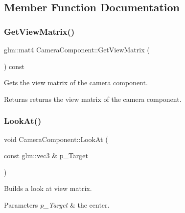 \subsection{Member Function Documentation}
\mbox{\label{class_camera_component_a7304926c3974f8a80e3fc0a6c5e49cd1}} 
\subsubsection{\texorpdfstring{GetViewMatrix()}{GetViewMatrix()}}
{\footnotesize\ttfamily glm\+::mat4 Camera\+Component\+::\+Get\+View\+Matrix (\begin{DoxyParamCaption}{ }\end{DoxyParamCaption}) const\hspace{0.3cm}{\ttfamily [inline]}}



Gets the view matrix of the camera component. 

\begin{DoxyReturn}{Returns}
returns the view matrix of the camera component. 
\end{DoxyReturn}
\mbox{\label{class_camera_component_a4c4afaba244a809c07db05e9ec958a5d}} 
\subsubsection{\texorpdfstring{LookAt()}{LookAt()}}
{\footnotesize\ttfamily void Camera\+Component\+::\+Look\+At (\begin{DoxyParamCaption}\item[{const glm\+::vec3 \&}]{p\+\_\+\+Target }\end{DoxyParamCaption})\hspace{0.3cm}{\ttfamily [inline]}}



Builds a look at view matrix. 


\begin{DoxyParams}{Parameters}
{\em p\+\_\+\+Target} & the center. \\
\hline
\end{DoxyParams}
\mbox{\label{class_camera_component_aa4c591ae0309634d43d7cee341eb6abf}} 
